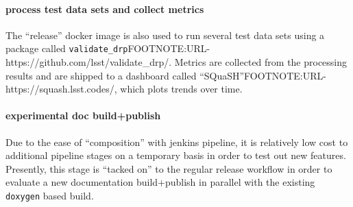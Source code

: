 \paragraph{process test data sets and collect metrics}

The ``release'' docker image is also used to run several test data sets using a
package called
\texttt{validate\_drp}FOOTNOTE:URL-https://github.com/lsst/validate\_drp/.
Metrics are collected from the processing results and are shipped to a
dashboard called ``SQuaSH''FOOTNOTE:URL-https://squash.lsst.codes/, which plots
trends over time.

\paragraph{experimental doc build+publish}

Due to the ease of ``composition'' with jenkins pipeline, it is relatively low
cost to additional pipeline stages on a temporary basis in order to test out
new features.  Presently, this stage is ``tacked on'' to the regular release
workflow in order to evaluate a new documentation build+publish in parallel
with the existing \texttt{doxygen} based build.
